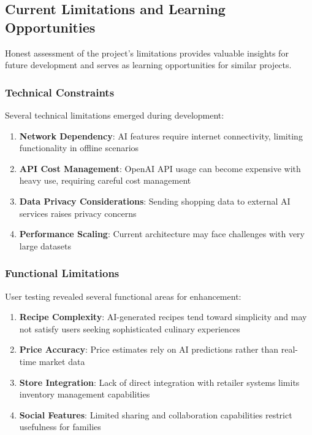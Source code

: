 \documentclass[11pt,a4paper]{article}
\begin{document}
\subsection{Current Limitations and Learning Opportunities}

Honest assessment of the project's limitations provides valuable insights for future development and serves as learning opportunities for similar projects.

\subsubsection{Technical Constraints}

Several technical limitations emerged during development:

\begin{enumerate}
    \item \textbf{Network Dependency}: AI features require internet connectivity, limiting functionality in offline scenarios
    \item \textbf{API Cost Management}: OpenAI API usage can become expensive with heavy use, requiring careful cost management
    \item \textbf{Data Privacy Considerations}: Sending shopping data to external AI services raises privacy concerns
    \item \textbf{Performance Scaling}: Current architecture may face challenges with very large datasets
\end{enumerate}

\subsubsection{Functional Limitations}

User testing revealed several functional areas for enhancement:

\begin{enumerate}
    \item \textbf{Recipe Complexity}: AI-generated recipes tend toward simplicity and may not satisfy users seeking sophisticated culinary experiences
    \item \textbf{Price Accuracy}: Price estimates rely on AI predictions rather than real-time market data
    \item \textbf{Store Integration}: Lack of direct integration with retailer systems limits inventory management capabilities
    \item \textbf{Social Features}: Limited sharing and collaboration capabilities restrict usefulness for families
\end{enumerate}
\end{document}

